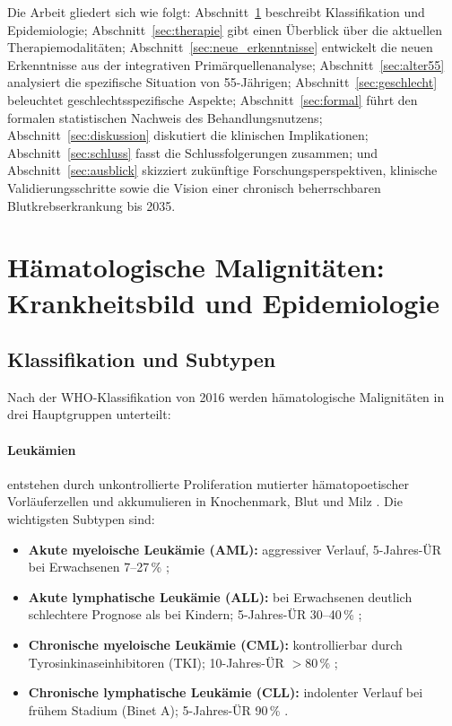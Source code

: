 ﻿\documentclass[12pt,a4paper]{article}
\theoremstyle{definition}
\begin{document}
Die Arbeit gliedert sich wie folgt: Abschnitt~\ref{sec:epidemiologie} beschreibt
Klassifikation und Epidemiologie; Abschnitt~\ref{sec:therapie} gibt einen Überblick
über die aktuellen Therapiemodalitäten; Abschnitt~\ref{sec:neue_erkenntnisse}
entwickelt die neuen Erkenntnisse aus der integrativen Primärquellenanalyse;
Abschnitt~\ref{sec:alter55} analysiert die spezifische Situation von 55-Jährigen;
Abschnitt~\ref{sec:geschlecht} beleuchtet geschlechtsspezifische Aspekte;
Abschnitt~\ref{sec:formal} führt den formalen statistischen Nachweis des
Behandlungsnutzens; Abschnitt~\ref{sec:diskussion} diskutiert die klinischen
Implikationen; Abschnitt~\ref{sec:schluss} fasst die Schlussfolgerungen zusammen;
und Abschnitt~\ref{sec:ausblick} skizziert zukünftige Forschungsperspektiven,
klinische Validierungsschritte sowie die Vision einer chronisch beherrschbaren
Blutkrebserkrankung bis 2035.

\section{Hämatologische Malignitäten: Krankheitsbild und Epidemiologie}
\label{sec:epidemiologie}

\subsection{Klassifikation und Subtypen}

Nach der WHO-Klassifikation von 2016 \cite{swerdlow2016} werden hämatologische
Malignitäten in drei Hauptgruppen unterteilt:

\paragraph{Leukämien} entstehen durch unkontrollierte Proliferation mutierter
hämatopoetischer Vorläuferzellen und akkumulieren in Knochenmark, Blut und Milz
\cite{adeyemi2025}. Die wichtigsten Subtypen sind:
\begin{itemize}
  \item \textbf{Akute myeloische Leukämie (AML):} aggressiver Verlauf, 5-Jahres-ÜR
        bei Erwachsenen 7--27\,\% \cite{adeyemi2025,dohner2017};
  \item \textbf{Akute lymphatische Leukämie (ALL):} bei Erwachsenen deutlich
        schlechtere Prognose als bei Kindern; 5-Jahres-ÜR 30--40\,\%
        \cite{kantarjian2021};
  \item \textbf{Chronische myeloische Leukämie (CML):} kontrollierbar durch
        Tyrosinkinaseinhibitoren (TKI); 10-Jahres-ÜR $>80\,\%$ \cite{hochhaus2017};
  \item \textbf{Chronische lymphatische Leukämie (CLL):} indolenter Verlauf bei
        frühem Stadium (Binet A); 5-Jahres-ÜR 90\,\% \cite{zenz2014}.
\end{itemize}
\end{document}
